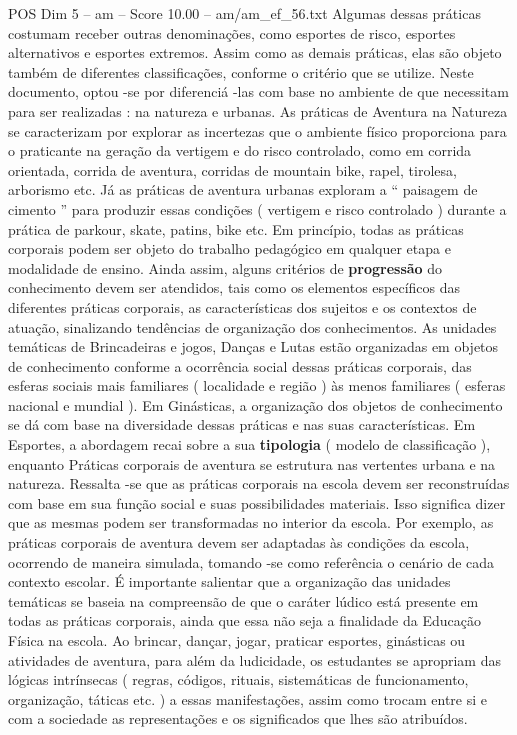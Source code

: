 \begin{textsample}{POS Dim 5 – am – Score 10.00 – am/am\_ef\_56.txt}
Algumas dessas práticas costumam receber outras denominações, como esportes de risco, esportes alternativos e esportes extremos.
Assim como as demais práticas, elas são objeto também de diferentes classificações, conforme o critério que se utilize.
Neste documento, optou -se por diferenciá -las com base no ambiente de que necessitam para ser realizadas : na natureza e urbanas.
As práticas de Aventura na Natureza se caracterizam por explorar as incertezas que o ambiente físico proporciona para o praticante na geração da vertigem e do risco controlado, como em corrida orientada, corrida de aventura, corridas de mountain bike, rapel, tirolesa, arborismo etc.
Já as práticas de aventura urbanas exploram a “ paisagem de cimento ” para produzir essas condições ( vertigem e risco controlado ) durante a prática de parkour, skate, patins, bike etc.
Em princípio, todas as práticas corporais podem ser objeto do trabalho pedagógico em qualquer etapa e modalidade de ensino.
Ainda assim, alguns critérios de \textbf{progressão} do conhecimento devem ser atendidos, tais como os elementos específicos das diferentes práticas corporais, as características dos sujeitos e os contextos de atuação, sinalizando tendências de organização dos conhecimentos.
As unidades temáticas de Brincadeiras e jogos, Danças e Lutas estão organizadas em objetos de conhecimento conforme a ocorrência social dessas práticas corporais, das esferas sociais mais familiares ( localidade e região ) às menos familiares ( esferas nacional e mundial ).
Em Ginásticas, a organização dos objetos de conhecimento se dá com base na diversidade dessas práticas e nas suas características.
Em Esportes, a abordagem recai sobre a sua \textbf{tipologia} ( modelo de classificação ), enquanto Práticas corporais de aventura se estrutura nas vertentes urbana e na natureza.
Ressalta -se que as práticas corporais na escola devem ser reconstruídas com base em sua função social e suas possibilidades materiais.
Isso significa dizer que as mesmas podem ser transformadas no interior da escola.
Por exemplo, as práticas corporais de aventura devem ser adaptadas às condições da escola, ocorrendo de maneira simulada, tomando -se como referência o cenário de cada contexto escolar.
É importante salientar que a organização das unidades temáticas se baseia na compreensão de que o caráter lúdico está presente em todas as práticas corporais, ainda que essa não seja a finalidade da Educação Física na escola.
Ao brincar, dançar, jogar, praticar esportes, ginásticas ou atividades de aventura, para além da ludicidade, os estudantes se apropriam das lógicas intrínsecas ( regras, códigos, rituais, sistemáticas de funcionamento, organização, táticas etc. ) a essas manifestações, assim como trocam entre si e com a sociedade as representações e os significados que lhes são atribuídos.

\end{textsample}
